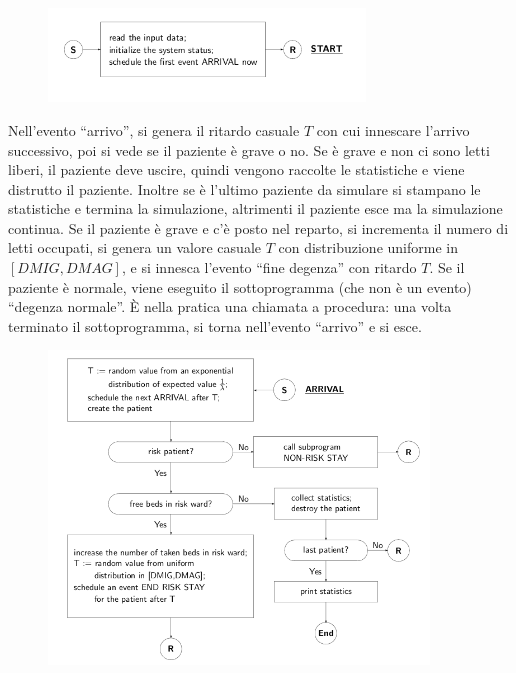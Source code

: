 \documentclass[11pt]{book}
\begin{document}
\begin{figure}[H]
  \centering
  \includegraphics[width=0.75\textwidth]{images/cap11fig17.png}
\end{figure}

Nell'evento ``arrivo'', si genera il ritardo casuale $T$ con cui innescare
l'arrivo successivo, poi si vede se il paziente \`e grave o no. Se \`e
grave e non ci sono letti liberi, il paziente deve uscire, quindi
vengono raccolte le statistiche e viene distrutto il paziente. Inoltre
se \`e l'ultimo paziente da simulare si stampano le statistiche e
termina la simulazione, altrimenti il paziente esce ma la simulazione
continua. Se il paziente \`e grave e c'\`e posto nel reparto, si
incrementa il numero di letti occupati, si genera un valore casuale
$T$ con distribuzione uniforme in $[DMIG,DMAG]$, e si innesca l'evento
``fine degenza'' con ritardo $T$. Se il paziente \`e normale, viene
eseguito il sottoprogramma (che non \`e un evento) ``degenza
normale''. \`E nella pratica una chiamata a procedura: una volta
terminato il sottoprogramma, si torna nell'evento ``arrivo'' e si
esce.

\begin{figure}[H]
  \centering
  \includegraphics[width=0.9\textwidth]{images/cap11fig18.png}
\end{figure}
\end{document}
